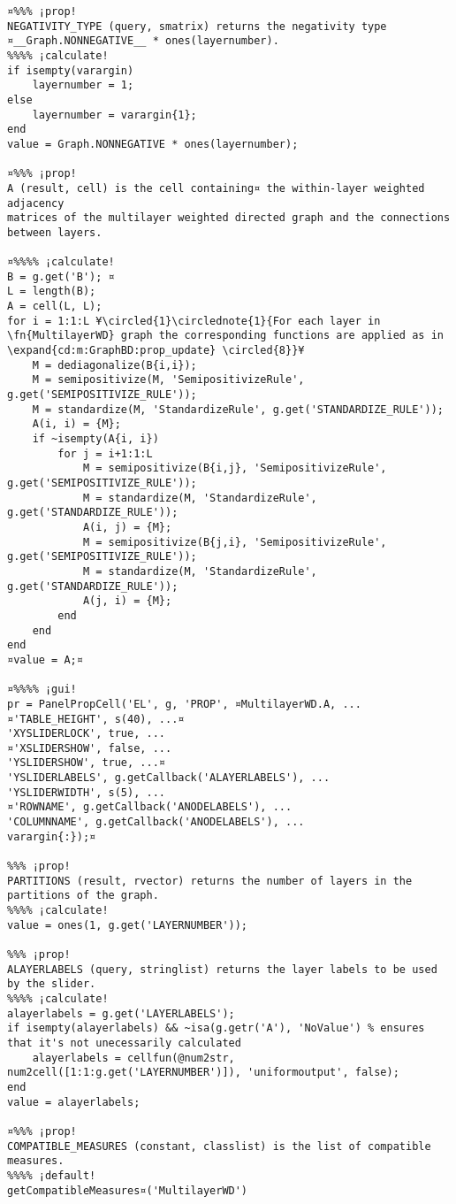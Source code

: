 \documentclass{tufte-handout}
\begin{document}
\begin{lstlisting}
¤%%% ¡prop!
NEGATIVITY_TYPE (query, smatrix) returns the negativity type ¤__Graph.NONNEGATIVE__ * ones(layernumber).
%%%% ¡calculate!
if isempty(varargin)
	layernumber = 1;
else
	layernumber = varargin{1};
end
value = Graph.NONNEGATIVE * ones(layernumber);

¤%%% ¡prop!
A (result, cell) is the cell containing¤ the within-layer weighted adjacency
matrices of the multilayer weighted directed graph and the connections
between layers.

¤%%%% ¡calculate!
B = g.get('B'); ¤
L = length(B); 
A = cell(L, L);
for i = 1:1:L ¥\circled{1}\circlednote{1}{For each layer in \fn{MultilayerWD} graph the corresponding functions are applied as in  \expand{cd:m:GraphBD:prop_update} \circled{8}}¥
	M = dediagonalize(B{i,i}); 
	M = semipositivize(M, 'SemipositivizeRule', g.get('SEMIPOSITIVIZE_RULE'));
	M = standardize(M, 'StandardizeRule', g.get('STANDARDIZE_RULE'));  
	A(i, i) = {M};
	if ~isempty(A{i, i})
		for j = i+1:1:L
			M = semipositivize(B{i,j}, 'SemipositivizeRule', 	g.get('SEMIPOSITIVIZE_RULE')); 
			M = standardize(M, 'StandardizeRule', 	g.get('STANDARDIZE_RULE'));  
			A(i, j) = {M};
			M = semipositivize(B{j,i}, 'SemipositivizeRule', 	g.get('SEMIPOSITIVIZE_RULE')); 
			M = standardize(M, 'StandardizeRule', 	g.get('STANDARDIZE_RULE'));  
			A(j, i) = {M};
		end
	end
end
¤value = A;¤

¤%%%% ¡gui!
pr = PanelPropCell('EL', g, 'PROP', ¤MultilayerWD.A, ...
¤'TABLE_HEIGHT', s(40), ...¤
'XYSLIDERLOCK', true, ... 
¤'XSLIDERSHOW', false, ...
'YSLIDERSHOW', true, ...¤
'YSLIDERLABELS', g.getCallback('ALAYERLABELS'), ...
'YSLIDERWIDTH', s(5), ...
¤'ROWNAME', g.getCallback('ANODELABELS'), ...
'COLUMNNAME', g.getCallback('ANODELABELS'), ...
varargin{:});¤

%%% ¡prop!
PARTITIONS (result, rvector) returns the number of layers in the partitions of the graph.
%%%% ¡calculate!
value = ones(1, g.get('LAYERNUMBER'));

%%% ¡prop!
ALAYERLABELS (query, stringlist) returns the layer labels to be used by the slider.
%%%% ¡calculate!
alayerlabels = g.get('LAYERLABELS');
if isempty(alayerlabels) && ~isa(g.getr('A'), 'NoValue') % ensures that it's not unecessarily calculated
	alayerlabels = cellfun(@num2str, num2cell([1:1:g.get('LAYERNUMBER')]), 'uniformoutput', false);
end
value = alayerlabels;

¤%%% ¡prop!
COMPATIBLE_MEASURES (constant, classlist) is the list of compatible measures.
%%%% ¡default!
getCompatibleMeasures¤('MultilayerWD')


\end{lstlisting}
\end{document}
